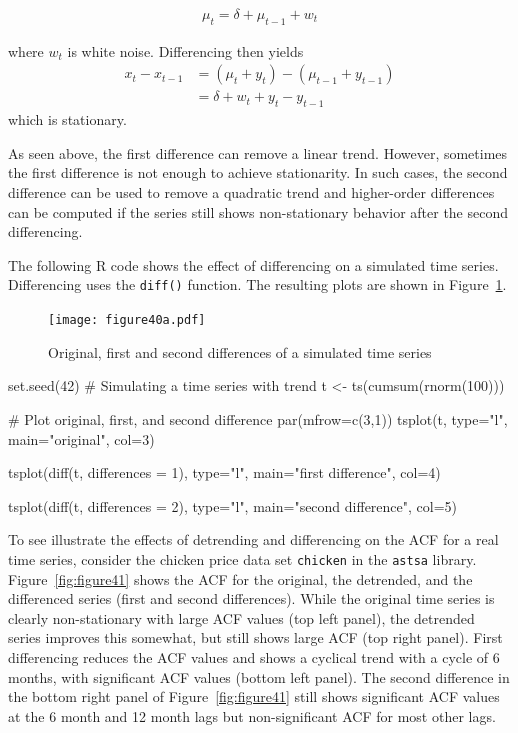 \begin{align*}\mu_t = \delta + \mu_{t-1} + w_t\end{align*}

\noindent where $w_t$ is white noise. Differencing then yields 
\begin{align*}
x_t - x_{t-1} &= (\mu_t + y_t) - (\mu_{t-1} + y_{t-1}) \\
 &= \delta + w_t + y_t - y_{t-1}
 \end{align*}
\noindent which is stationary.

As seen above, the first difference can remove a linear trend. However, sometimes the first difference is not enough to achieve stationarity. In such cases, the second difference can be used to remove a quadratic trend and higher-order differences can be computed if the series still shows non-stationary behavior after the second differencing.

The following R code shows the effect of differencing on a simulated time series. Differencing uses the \texttt{diff()} function. The resulting plots are shown in Figure~\ref{fig:figure40a}.

\begin{figure}
\centering
\texttt{[image: figure40a.pdf]}
\caption{Original, first and second differences of a simulated time series}
\label{fig:figure40a}
\end{figure}

\begin{Rcode}
set.seed(42)
# Simulating a time series with trend
t <- ts(cumsum(rnorm(100))) 

# Plot original, first, and second difference
par(mfrow=c(3,1))
tsplot(t, type="l", 
    main="original", col=3)

tsplot(diff(t, differences = 1), type="l", 
    main="first difference", col=4)

tsplot(diff(t, differences = 2), type="l", 
    main="second difference", col=5)
\end{Rcode}

To see illustrate the effects of detrending and differencing on the ACF for a real time series, consider the chicken price data set \texttt{chicken} in the \texttt{astsa} library. Figure~\ref{fig:figure41} shows the ACF for the original, the detrended, and the differenced series (first and second differences). While the original time series is clearly non-stationary with large ACF values (top left panel), the detrended series improves this somewhat, but still shows large ACF (top right panel). First differencing reduces the ACF values and shows a cyclical trend with a cycle of 6 months, with significant ACF values (bottom left panel). The second difference in the bottom right panel of Figure~\ref{fig:figure41} still shows significant ACF values at the 6 month and 12 month lags but non-significant ACF for most other lags. 

